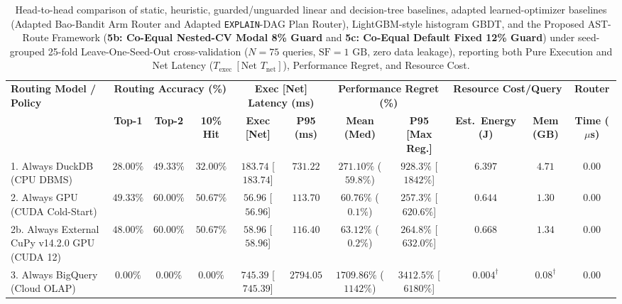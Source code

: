 \documentclass[10pt,a4paper]{article}
\newenvironment{fitasttable}{%
  \begin{lrbox}{\asttblbox}%
}{%
  \end{lrbox}%
  \sbox{\asttblboxB}{%
    \ifdim\wd\asttblbox>0.96\textwidth
      \resizebox{0.96\textwidth}{!}{\usebox{\asttblbox}}%
    \else
      \usebox{\asttblbox}%
    \fi
  }%
  \ifdim\ht\asttblboxB>0.72\textheight
    \resizebox{!}{0.72\textheight}{\usebox{\asttblboxB}}%
  \else
    \usebox{\asttblboxB}%
  \fi
}
\begin{document}
\begin{table}[!htbp]
\centering
\caption{Head-to-head comparison of static, heuristic, guarded/unguarded linear and decision-tree baselines, adapted learned-optimizer baselines (Adapted Bao-Bandit Arm Router and Adapted \texttt{EXPLAIN}-DAG Plan Router), LightGBM-style histogram GBDT, and the Proposed AST-Route Framework (\textbf{5b: Co-Equal Nested-CV Modal 8\% Guard} and \textbf{5c: Co-Equal Default Fixed 12\% Guard}) under seed-grouped 25-fold Leave-One-Seed-Out cross-validation ($N=75$ queries, $\text{SF}=1\text{ GB}$, zero data leakage), reporting both Pure Execution and Net Latency ($T_{\text{exec}}\ [\text{Net } T_{\text{net}}]$), Performance Regret, and Resource Cost.}\label{tab:jbd_routing_t8}
\label{tab:routing_evaluation}\label{tab:query_routing}\label{tab:router_eval}
\scriptsize
\setlength{\tabcolsep}{2.7pt}
\renewcommand{\arraystretch}{1.07}
\begin{fitasttable}
\begin{tabular}{@{}lcccccccccc@{}}
\toprule
\multirow{2}{*}{\textbf{Routing Model / Policy}} & \multicolumn{3}{c}{\textbf{Routing Accuracy (\%)}} & \multicolumn{2}{c}{\textbf{Exec [Net] Latency (ms)}} & \multicolumn{2}{c}{\textbf{Performance Regret (\%)}} & \multicolumn{2}{c}{\textbf{Resource Cost/Query}} & \textbf{Router} \\
\cmidrule(lr){2-4} \cmidrule(lr){5-6} \cmidrule(lr){7-8} \cmidrule(lr){9-10} \cmidrule(lr){11-11}
 & \textbf{Top-1} & \textbf{Top-2} & \textbf{10\% Hit} & \textbf{Exec [Net]} & \textbf{P95 (ms)} & \textbf{Mean (Med)} & \textbf{P95 [Max Reg.]} & \textbf{Est.\ Energy (J)} & \textbf{Mem (GB)} & \textbf{Time ($\mu$s)} \\
\midrule
1. Always DuckDB (CPU DBMS) & $28.00\%$ & $49.33\%$ & $32.00\%$ & $183.74$ [$183.74$] & $731.22$ & $271.10\%$ ($59.8\%$) & $928.3\%$ [$1842\%$] & $6.397$ & $4.71$ & $0.00$ \\
2. Always GPU (CUDA Cold-Start) & $49.33\%$ & $60.00\%$ & $50.67\%$ & $56.96$ [$56.96$] & $113.70$ & $60.76\%$ ($0.1\%$) & $257.3\%$ [$620.6\%$] & $0.644$ & $1.30$ & $0.00$ \\
2b. Always External CuPy v14.2.0 GPU (CUDA 12) & $48.00\%$ & $60.00\%$ & $50.67\%$ & $58.96$ [$58.96$] & $116.40$ & $63.12\%$ ($0.2\%$) & $264.8\%$ [$632.0\%$] & $0.668$ & $1.34$ & $0.00$ \\
3. Always BigQuery (Cloud OLAP) & $0.00\%$ & $0.00\%$ & $0.00\%$ & $745.39$ [$745.39$] & $2794.05$ & $1709.86\%$ ($1142\%$) & $3412.5\%$ [$6180\%$] & $0.004^{\dagger}$ & $0.08^{\dagger}$ & $0.00$ \\

\end{tabular}
\end{fitasttable}
\end{table}
\end{document}
